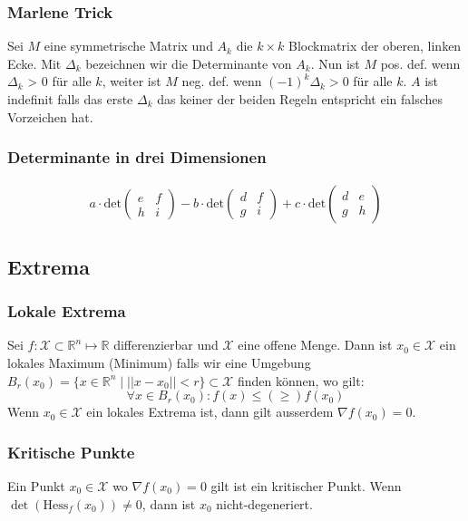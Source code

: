 \documentclass[a4paper,10pt]{article}
\def\R{\mathbb{R}}
\def\X{\mathcal{X}}
\begin{document}
\subsubsection*{Marlene Trick}

Sei $M$ eine symmetrische Matrix und $A_k$ die $k \times k$ Blockmatrix der oberen, linken Ecke. Mit $\Delta_k$ bezeichnen wir die Determinante von $A_k$. Nun ist $M$ pos. def. wenn $\Delta_k$ > 0 für alle $k$, weiter ist $M$ neg. def.
wenn $(-1)^k \Delta_k > 0$ für alle $k$. $A$ ist indefinit falls das erste $\Delta_k$ das keiner der beiden Regeln entspricht ein falsches Vorzeichen hat.

\subsubsection*{Determinante in drei Dimensionen}
\begin{align*}
  a \cdot \text{det}
  \begin{pmatrix}
    e & f\\
    h & i
  \end{pmatrix}
  - b \cdot \text{det}
  \begin{pmatrix}
    d & f\\
    g & i
  \end{pmatrix}
  + c \cdot \text{det}
  \begin{pmatrix}
    d & e\\
    g & h
  \end{pmatrix}
\end{align*}
\subsection{Extrema}
\subsubsection*{Lokale Extrema}
Sei \(f: \X \subset \R^n \mapsto \R\) differenzierbar und \(\X\) eine offene Menge. Dann ist \(x_0 \in \X\) ein lokales Maximum (Minimum) falls wir eine Umgebung \(B_r(x_0) = \{x\in \R^n \mid ||x-x_0|| < r \} \subset \X\) finden können, wo gilt:
\[\forall x \in B_r(x_0): f(x) \le (\ge) f(x_0)\]
Wenn \(x_0 \in \X\) ein lokales Extrema ist, dann gilt ausserdem \(\nabla f(x_0) = 0\).

\subsubsection*{Kritische Punkte}
Ein Punkt \(x_0 \in \X\) wo \(\nabla f(x_0) = 0\) gilt ist ein kritischer Punkt. Wenn \(\det(\text{Hess}_f(x_0)) \ne 0\), dann ist \(x_0\) nicht-degeneriert.
\end{document}

